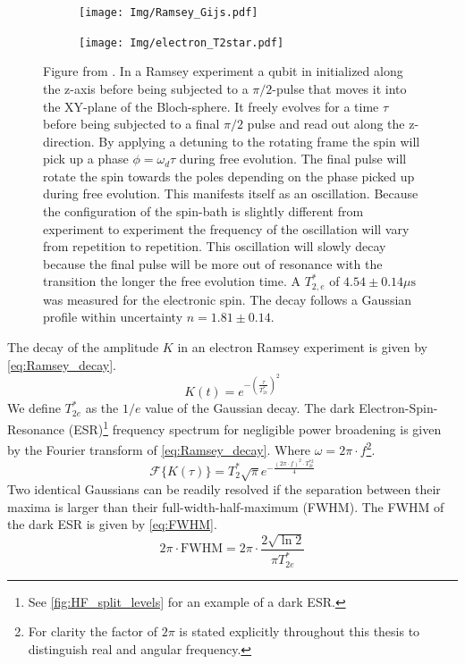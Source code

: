 \begin{figure}[htbp]
    \centering
    \begin{subfigure}[t]{0.49\textwidth}\centering
        \caption{}
        \texttt{[image: Img/Ramsey\_Gijs.pdf]}
        \label{fig:Ramsey_gijs}
    \end{subfigure}
    \begin{subfigure}[t]{0.49\textwidth}\centering
        \caption{}
        \texttt{[image: Img/electron\_T2star.pdf]}
        \label{fig:electron_T2*}
    \end{subfigure}
        \caption{
        Figure from \citep{Lange2012Quantum}.
        In a Ramsey experiment a qubit in initialized along the z-axis before being subjected to a $\pi/2$-pulse that moves it into the XY-plane of the Bloch-sphere. It freely evolves for a time $\tau$ before being subjected to a final $\pi/2$ pulse and read out along the z-direction.
        By applying a detuning to the rotating frame the spin will pick up a phase $\phi = \omega_d \tau$ during free evolution.
        The final pulse will rotate the spin towards the poles depending on the phase picked up during free evolution.
        This manifests itself as an oscillation.
        Because the configuration of the spin-bath is slightly different from experiment to experiment the frequency of the oscillation will vary from repetition to repetition.
        This oscillation will slowly decay because the final pulse will be more out of resonance with the transition the longer the free evolution time.
        A $T_{2,e}^*$ of $4.54 \pm 0.14 \mu\mathrm{s}$ was measured for the electronic spin. The decay follows a Gaussian profile within uncertainty $n = 1.81 \pm 0.14$. }
\end{figure}

The decay of the amplitude $K$ in an electron Ramsey experiment is given by \cref{eq:Ramsey_decay}.
\begin{equation}
    K(t) = e^{-(\tfrac{\tau}{T_{2e}^*})^2}
    \label{eq:Ramsey_decay}
\end{equation}
We define $T_{2e}^*$ as the $1/e$ value of the Gaussian decay. The dark Electron-Spin-Resonance (ESR)\footnote{See \cref{fig:HF_split_levels} for an example of a dark ESR.} frequency spectrum for negligible power broadening is given by the Fourier transform of \cref{eq:Ramsey_decay}. Where $\omega = 2\pi \cdot f$\footnote{For clarity the factor of $2\pi$ is stated explicitly throughout this thesis to distinguish real and angular frequency. }.
\begin{equation}
    \mathcal{F} \{ K(\tau) \} =  T_2^* \sqrt{\pi} e^{-\tfrac{(2\pi \cdot f) ^2 \cdot T_{2e}^{*2}}{ 4}}
\end{equation}
Two identical Gaussians can be readily resolved if the separation between their maxima is larger than their full-width-half-maximum (FWHM).
The FWHM of the dark ESR is given by \cref{eq:FWHM}.
\begin{equation}
    2\pi \cdot \mathrm{FWHM} = 2\pi \cdot \frac{2\sqrt{\ln{2}}}{\pi T_{2e}^*}
    \label{eq:FWHM}
\end{equation}

